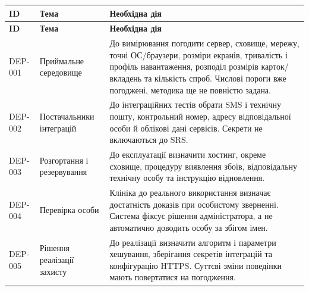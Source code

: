 \documentclass[11pt,a4paper]{article}
\begin{document}
\begin{longtable}{>{\raggedright\arraybackslash}p{2.4cm} >{\raggedright\arraybackslash}p{3.2cm} >{\raggedright\arraybackslash}p{9.6cm}}
\toprule
\textbf{ID} & \textbf{Тема} & \textbf{Необхідна дія} \\ \midrule
\endfirsthead
\toprule
\textbf{ID} & \textbf{Тема} & \textbf{Необхідна дія} \\ \midrule
\endhead
\bottomrule
\endfoot
DEP-001 & Приймальне середовище & До вимірювання погодити сервер, сховище, мережу, точні ОС/браузери, розміри екранів, тривалість і профіль навантаження, розподіл розмірів карток/вкладень та кількість спроб. Числові пороги вже погоджені, методика ще не повністю задана. \\
DEP-002 & Постачальники інтеграцій & До інтеграційних тестів обрати SMS і технічну пошту, контрольний номер, адресу відповідальної особи й облікові дані сервісів. Секрети не включаються до SRS. \\
DEP-003 & Розгортання і резервування & До експлуатації визначити хостинг, окреме сховище, процедуру виявлення збоїв, відповідальну технічну особу та інструкцію відновлення. \\
DEP-004 & Перевірка особи & Клініка до реального використання визначає достатність доказів при особистому зверненні. Система фіксує рішення адміністратора, а не автоматично доводить особу за збігом імен. \\
DEP-005 & Рішення реалізації захисту & До реалізації визначити алгоритм і параметри хешування, зберігання секретів інтеграцій та конфігурацію HTTPS. Суттєві зміни поведінки мають повертатися на погодження. \\
\end{longtable}
\end{document}

